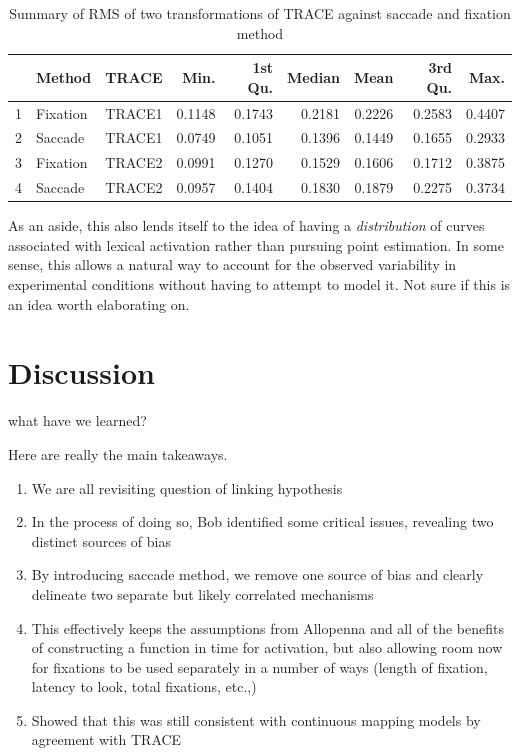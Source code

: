 \documentclass{article}
\begin{document}
\begin{table}[ht]
\centering
\begin{tabular}{rllrrrrrr}
  \hline
 & Method & TRACE & Min. & 1st Qu. & Median & Mean & 3rd Qu. & Max. \\ 
  \hline
1 & Fixation & TRACE1 & 0.1148 & 0.1743 & 0.2181 & 0.2226 & 0.2583 & 0.4407 \\ 
  2 & Saccade & TRACE1 & 0.0749 & 0.1051 & 0.1396 & 0.1449 & 0.1655 & 0.2933 \\ \hline
  3 & Fixation & TRACE2 & 0.0991 & 0.1270 & 0.1529 & 0.1606 & 0.1712 & 0.3875 \\ 
  4 & Saccade & TRACE2 & 0.0957 & 0.1404 & 0.1830 & 0.1879 & 0.2275 & 0.3734 \\ 
   \hline
\end{tabular}
\caption{Summary of RMS of two transformations of TRACE against saccade and fixation method}
\label{tab:mise_trace}
\end{table}

As an aside, this also lends itself to the idea of having a \textit{distribution} of curves associated with lexical activation rather than pursuing point estimation.  In some sense, this allows a natural way to account for the observed variability in experimental conditions without having to attempt to model it. Not sure if this is an idea worth elaborating on.



\section{Discussion}

what have we learned?

Here are really the main takeaways.

\begin{singlespace}
\begin{enumerate}
\vspace{-2mm}
\item We are all revisiting question of linking hypothesis
\item In the process of doing so, Bob identified some critical issues, revealing two distinct sources of bias
\item By introducing saccade method, we remove one source of bias and clearly delineate two separate but likely correlated mechanisms
\item This effectively keeps the assumptions from Allopenna and all of the benefits of constructing a function in time for activation, but also allowing room now for fixations to be used separately in a number of ways (length of fixation, latency to look, total fixations, etc.,)
\item Showed that this was still consistent with continuous mapping models by agreement with TRACE
\end{enumerate}
\end{singlespace}
\end{document}
